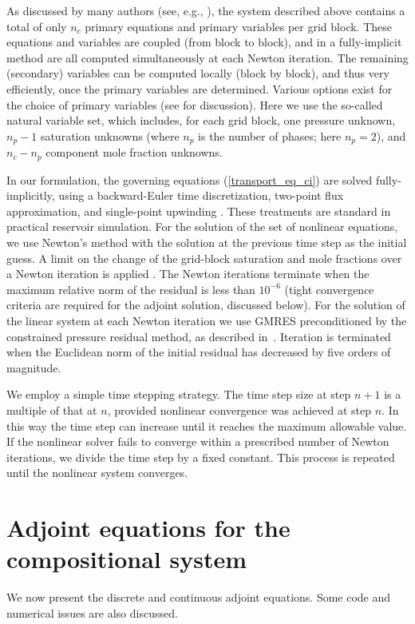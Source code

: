 \documentclass[twocolumn,numbook]{svjour3}          %
\begin{document}
As discussed by many authors (see, e.g.,
\cite{Coats:1980,Cao:Thesis,Voskov:2012,Young:1983}), the system described
above contains a total of only $n_c$ primary equations and primary variables per
grid block. These equations and variables are coupled (from block to block), and
in a fully-implicit method are all computed simultaneously at each Newton
iteration. The remaining (secondary) variables can be computed locally (block by
block), and thus very efficiently, once the primary variables are determined.
Various options exist for the choice of primary variables (see
\cite{Voskov:2012} for discussion). Here we use the so-called natural variable
set, which includes, for each grid block, one pressure unknown, $n_p-1$
saturation unknowns (where $n_p$ is the number of phases; here $n_p=2$), and $n_c-n_p$ component mole fraction unknowns.

In our formulation, the governing equations (\ref{transport_eq_ci}) are solved
fully-implicitly, using a backward-Euler time discretization, two-point flux
approximation, and single-point upwinding \cite{Aziz_book79}. These treatments
are standard in practical reservoir simulation. For the solution of the set of
nonlinear equations, we use Newton's method with the solution at the previous
time step as the initial guess. A limit on the change of the grid-block
saturation and mole fractions over a Newton iteration is applied
\cite{Younis:2010}. The Newton iterations terminate when the maximum relative
norm of the residual is less than $10^{-6}$ (tight convergence criteria are
  required for the adjoint solution, discussed below). For the solution of the
linear system at each Newton iteration we use GMRES preconditioned by the
constrained pressure residual method, as described in~\cite{CPRA}. Iteration is
terminated when the Euclidean norm of the initial residual has decreased by five
orders of magnitude.

We employ a simple time stepping strategy. The time step size at step $n+1$ is a
multiple of that at $n$, provided nonlinear convergence was achieved at step
$n$.  In this way the time step can increase until it reaches the maximum
allowable value. If the nonlinear solver fails to converge within a prescribed number
of Newton iterations, we divide the time step by a fixed constant. This process
is repeated until the nonlinear system converges.



\section{Adjoint equations for the compositional system} \label{sec:adjoint}
We now present the discrete and continuous adjoint equations. Some code and numerical issues are also discussed.
\end{document}
